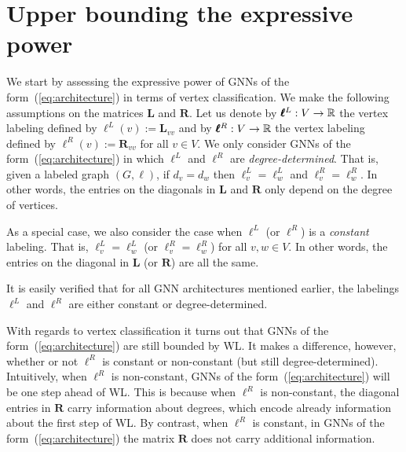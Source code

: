 \section{Upper bounding the expressive power}

We start by assessing the expressive power of GNNs of the form~(\ref{eq:architecture}) in terms of vertex classification. We make the following assumptions on the matrices $\mathbf{L}$ and $\mathbf{R}$.
Let us denote by $\pmb{\ell}^L:V\to \mathbb{R}$ the vertex labeling defined by $\pmb{\ell}^L(v):=\mathbf{L}_{vv}$ and by $\pmb{\ell}^R:V\to \mathbb{R}$ the vertex labeling defined by 
$\pmb{\ell}^R(v):=\mathbf{R}_{vv}$ for all $v\in V$. We only consider GNNs of the form~(\ref{eq:architecture}) in which $\pmb{\ell}^L$ and $\pmb{\ell}^R$ are \textit{degree-determined}. That is, given a labeled graph $(G,\pmb{\ell})$, if $d_v=d_w$ then $\pmb{\ell}^L_v=\pmb{\ell}^L_w$ and $\pmb{\ell}^R_v=\pmb{\ell}^R_w$. In other words,
the entries on the diagonals in $\mathbf{L}$ and $\mathbf{R}$ only depend on the degree of vertices.

As a special case, we also consider the case when $\pmb{\ell}^L$ (or $\pmb{\ell}^R$) is a 
\textit{constant} labeling. That is,  $\pmb{\ell}^L_v=\pmb{\ell}^L_w$ (or $\pmb{\ell}^R_v=\pmb{\ell}^R_w$) for all $v,w\in V$. In other words, the entries on the diagonal in $\mathbf{L}$ (or $\mathbf{R}$) are all the same.

It is easily verified that for all GNN architectures mentioned earlier, the labelings $\pmb{\ell}^L$ and $\pmb{\ell}^R$ are either constant or degree-determined.

With regards to vertex classification it turns out that GNNs of the form~(\ref{eq:architecture}) are still bounded by WL. It makes a difference, however, whether or not $\pmb{\ell}^R$ is constant or non-constant (but still degree-determined). Intuitively, when $\pmb{\ell}^R$ is non-constant, GNNs of the form~(\ref{eq:architecture}) will be one step ahead of WL. This is because when $\pmb{\ell}^R$ is non-constant, the diagonal entries in $\mathbf{R}$ carry information about degrees, which encode already information about the first step of WL. By contrast, when $\pmb{\ell}^R$ is constant, in 
GNNs of the form~(\ref{eq:architecture}) the matrix $\mathbf{R}$ does not carry additional information. 

